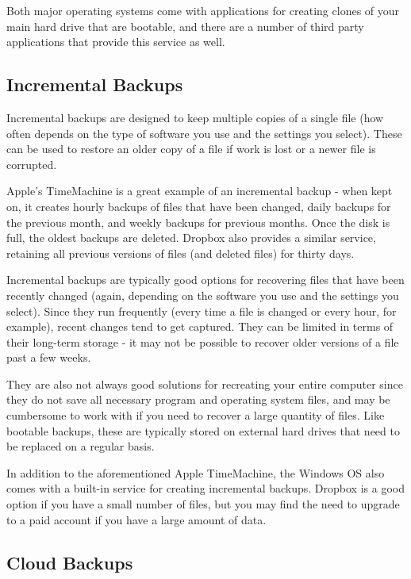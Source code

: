 \documentclass[]{book}
\theoremstyle{definition}
\theoremstyle{definition}
\theoremstyle{remark}
\begin{document}
Both major operating systems come with applications for creating clones
of your main hard drive that are bootable, and there are a number of
third party applications that provide this service as well.

\subsection{Incremental Backups}\label{incremental-backups}

Incremental backups are designed to keep multiple copies of a single
file (how often depends on the type of software you use and the settings
you select). These can be used to restore an older copy of a file if
work is lost or a newer file is corrupted.

Apple's TimeMachine is a great example of an incremental backup - when
kept on, it creates hourly backups of files that have been changed,
daily backups for the previous month, and weekly backups for previous
months. Once the disk is full, the oldest backups are deleted. Dropbox
also provides a similar service, retaining all previous versions of
files (and deleted files) for thirty days.

Incremental backups are typically good options for recovering files that
have been recently changed (again, depending on the software you use and
the settings you select). Since they run frequently (every time a file
is changed or every hour, for example), recent changes tend to get
captured. They can be limited in terms of their long-term storage - it
may not be possible to recover older versions of a file past a few
weeks.

They are also not always good solutions for recreating your entire
computer since they do not save all necessary program and operating
system files, and may be cumbersome to work with if you need to recover
a large quantity of files. Like bootable backups, these are typically
stored on external hard drives that need to be replaced on a regular
basis.

In addition to the aforementioned Apple TimeMachine, the Windows OS also
comes with a built-in service for creating incremental backups. Dropbox
is a good option if you have a small number of files, but you may find
the need to upgrade to a paid account if you have a large amount of
data.

\subsection{Cloud Backups}\label{cloud-backups}
\end{document}

